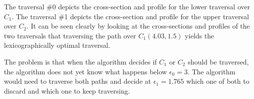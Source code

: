 The traversal \#0 depicts the cross-section and profile for the lower traversal over $C_1$. The traversal \#1 depicts the cross-section and profile for the upper traversal over $C_2$. It can be seen clearly by looking at the cross-sections and profiles of the two traversals that traversing the path over $C_1(4.03, 1.5)$ yields the lexicographically optimal traversal.

The problem is that when the algorithm decides if $C_1$ or $C_2$ should be traversed, the algorithm does not yet know what happens below $\epsilon_0 = 3$. The algorithm would need to traverse both paths and decide at $\epsilon_1 = 1.765$ which one of both to discard and which one to keep traversing.




